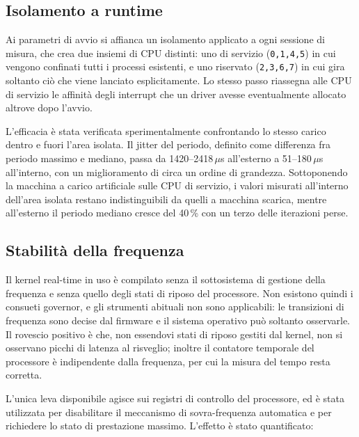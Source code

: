 \documentclass[11pt,a4paper]{article}
\newcommand{\us}{\,$\mu$s}
\begin{document}
\subsection{Isolamento a runtime}

Ai parametri di avvio si affianca un isolamento applicato a ogni sessione di misura, che crea due
insiemi di CPU distinti: uno di servizio (\texttt{0,1,4,5}) in cui vengono confinati tutti i
processi esistenti, e uno riservato (\texttt{2,3,6,7}) in cui gira soltanto ci\`o che viene
lanciato esplicitamente. Lo stesso passo riassegna alle CPU di servizio le affinit\`a degli
interrupt che un driver avesse eventualmente allocato altrove dopo l'avvio.

L'efficacia \`e stata verificata sperimentalmente confrontando lo stesso carico dentro e fuori
l'area isolata. Il jitter del periodo, definito come differenza fra periodo massimo e mediano,
passa da 1420--2418\us{} all'esterno a 51--180\us{} all'interno, con un miglioramento di circa un
ordine di grandezza. Sottoponendo la macchina a carico artificiale sulle CPU di servizio, i valori
misurati all'interno dell'area isolata restano indistinguibili da quelli a macchina scarica,
mentre all'esterno il periodo mediano cresce del 40\,\% con un terzo delle iterazioni perse.

\subsection{Stabilit\`a della frequenza}

Il kernel real-time in uso \`e compilato senza il sottosistema di gestione della frequenza e senza
quello degli stati di riposo del processore. Non esistono quindi i consueti governor, e gli
strumenti abituali non sono applicabili: le transizioni di frequenza sono decise dal firmware e il
sistema operativo pu\`o soltanto osservarle. Il rovescio positivo \`e che, non essendovi stati di
riposo gestiti dal kernel, non si osservano picchi di latenza al risveglio; inoltre il contatore
temporale del processore \`e indipendente dalla frequenza, per cui la misura del tempo resta
corretta.

L'unica leva disponibile agisce sui registri di controllo del processore, ed \`e stata utilizzata
per disabilitare il meccanismo di sovra-frequenza automatica e per richiedere lo stato di
prestazione massimo. L'effetto \`e stato quantificato:
\end{document}
